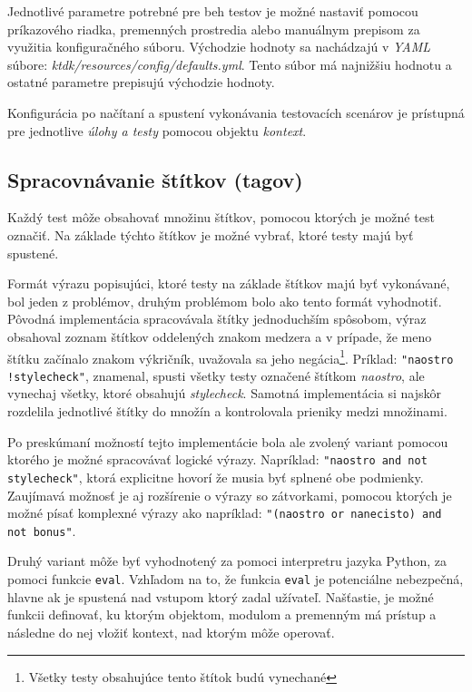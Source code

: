 \documentclass[
  digital, %
  twoside, %
  table,   %
  lof,     %
  lot,     %
]{fithesis3}
\begin{document}
Jednotlivé parametre potrebné pre beh testov je možné nastaviť pomocou príkazového riadka, premenných prostredia alebo manuálnym prepisom za využitia konfiguračného súboru. Východzie hodnoty sa nachádzajú v \emph{YAML} súbore: \emph{ktdk/resources/config/defaults.yml}. Tento súbor má najnižšiu hodnotu a ostatné parametre prepisujú východzie hodnoty. 

Konfigurácia po načítaní a spustení vykonávania testovacích scenárov je prístupná pre jednotlive \emph{úlohy a testy} pomocou objektu \emph{kontext}.

\subsection{Spracovnávanie štítkov (tagov)}

Každý test môže obsahovať množinu štítkov, pomocou ktorých je možné test označiť.
Na základe týchto štítkov je možné vybrať, ktoré testy majú byť spustené.

Formát výrazu popisujúci, ktoré testy na základe štítkov majú byť vykonávané, bol jeden z problémov, druhým problémom bolo ako tento formát vyhodnotiť. Pôvodná implementácia spracovávala štítky jednoduchším spôsobom, výraz obsahoval zoznam štítkov oddelených znakom medzera a v prípade, že meno štítku začínalo znakom výkričník, uvažovala sa jeho negácia\footnote{Všetky testy obsahujúce tento štítok budú vynechané}. Príklad: \texttt{"naostro !stylecheck"}, znamenal, spusti všetky testy označené štítkom \emph{naostro}, ale vynechaj všetky, ktoré obsahujú \emph{stylecheck}. Samotná implementácia si najskôr rozdelila jednotlivé štítky do množín a kontrolovala prieniky medzi množinami. 

Po preskúmaní možností tejto implementácie bola ale zvolený variant pomocou ktorého je možné spracovávať logické výrazy. Napríklad: \texttt{"naostro and not stylecheck"}, ktorá explicitne hovorí že musia byť splnené obe podmienky. Zaujímavá možnosť je aj rozšírenie o výrazy so zátvorkami, pomocou ktorých je možné písať komplexné výrazy ako napríklad: \texttt{"(naostro or nanecisto) and not bonus"}. 

Druhý variant môže byť vyhodnotený za pomoci interpretru jazyka Python, za pomoci funkcie \texttt{eval}. Vzhľadom na to, že funkcia \texttt{eval} je potenciálne nebezpečná, hlavne ak je spustená nad vstupom ktorý zadal užívateľ. Našťastie, je možné funkcii definovať, ku ktorým objektom, modulom a premenným má prístup a následne do nej vložiť kontext, nad ktorým môže operovať. 
\end{document}
